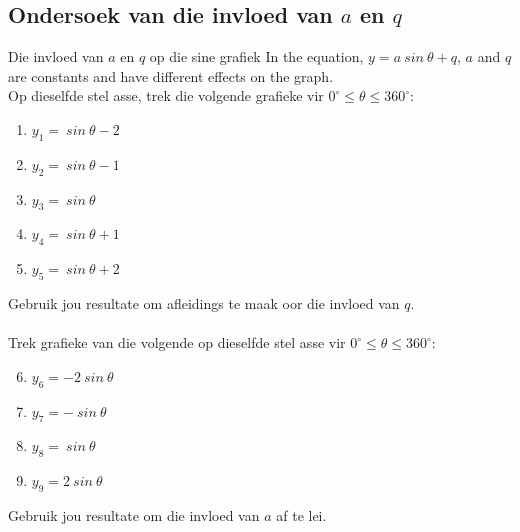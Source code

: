 \subsection*{Ondersoek van die invloed van $a$ en $q$}
\nopagebreak
\begin{Investigation}{Die invloed van $a$ en $q$ op die sine grafiek}
In the equation, $y=a~sin~\theta+q$, $a$ and $q$ are constants and have different effects on the graph.\\
Op dieselfde stel asse, trek die volgende grafieke vir $0^{\circ}\leq \theta\leq 360^ {\circ}$:
\begin{enumerate}[noitemsep, label=\textbf{\arabic*}. ] 
\item $y_1=~sin~\theta -2$
\item $y_2=~sin~\theta -1$
\item $y_3=~sin~\theta $
\item $y_4=~sin~\theta +1$
\item $y_5=~sin~\theta +2$
\end{enumerate}
Gebruik jou resultate om afleidings te maak oor die invloed van $q$.\\
\\
Trek grafieke van die volgende op dieselfde stel asse vir $0^{\circ}\leq \theta\leq 360^ {\circ}$:
\begin{enumerate}[noitemsep, label=\textbf{\arabic*}. ] 
\setcounter{enumi}{5}
\item $y_6=-2~sin~\theta $
\item $y_7=-~sin~\theta $
\item $y_8=~sin~\theta $
\item $y_9=2~sin~\theta $
\end{enumerate}
Gebruik jou resultate om die invloed van $a$ af te lei.
\end{Investigation}
